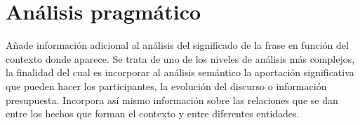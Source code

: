 \section{An\'alisis pragm\'atico}

A\~nade informaci\'on adicional al an\'alisis del significado de la frase en funci\'on del contexto donde aparece. Se trata de uno de los niveles de an\'alisis m\'as complejos, la finalidad del cual es incorporar al an\'alisis sem\'antico la aportaci\'on significativa que pueden hacer los participantes, la evoluci\'on del discurso o informaci\'on presupuesta.
Incorpora as\'i mismo informaci\'on sobre las relaciones que se dan entre los hechos que forman el contexto y entre diferentes entidades. \cite{elprofesionaldelainformacion}